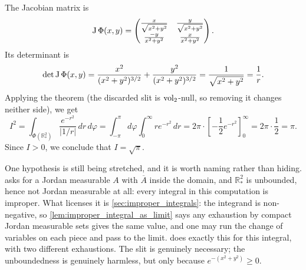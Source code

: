 \begin{example}
\begin{center}
\end{center}

The Jacobian matrix is
\[
\operatorname{J}\Phi(x,y) = \begin{pmatrix} \frac{x}{\sqrt{x^2+y^2}} & \frac{y}{\sqrt{x^2+y^2}} \\[1ex] \frac{-y}{x^2+y^2} & \frac{x}{x^2+y^2} \end{pmatrix}.
\]
Its determinant is
\[
\det \operatorname{J}\Phi(x,y) = \frac{x^2}{(x^2+y^2)^{3/2}} + \frac{y^2}{(x^2+y^2)^{3/2}} = \frac{1}{\sqrt{x^2+y^2}} = \frac{1}{r}.
\]
Applying the theorem (the discarded slit is $\operatorname{vol}_2$-null, so removing it changes neither
side), we get
\[
I^2 = \int_{\Phi(\mathbb{R}^2_\ast)} \frac{e^{-r^2}}{\lvert1/r\rvert} \,dr\,d\varphi = \int_{-\pi}^\pi d\varphi \int_0^\infty r e^{-r^2}\,dr = 2\pi \cdot \left[ -\frac{1}{2} e^{-r^2} \right]_0^\infty = 2\pi \cdot \frac{1}{2} = \pi.
\]
Since $I > 0$, we conclude that $I = \sqrt{\pi}$.
\end{example}

\begin{ainote}
\label{note:gaussian_is_improper}
One hypothesis is still being stretched, and it is worth naming rather than hiding.
 asks for a Jordan measurable $A$ with $\overline A$ inside the
domain, and $\mathbb{R}^2_\ast$ is unbounded, hence not Jordan measurable at all: every integral
in this computation is improper. What licenses it is
\cref{sec:improper_integrals}: the integrand is non-negative, so
\cref{lem:improper_integral_as_limit} says any exhaustion by compact Jordan measurable sets
gives the same value, and one may run the change of variables on each piece and pass to the
limit.  does exactly this for this integral, with two
different exhaustions. The slit is genuinely necessary; the unboundedness is genuinely harmless,
but only because $e^{-(x^2+y^2)} \geq 0$.
\end{ainote}

